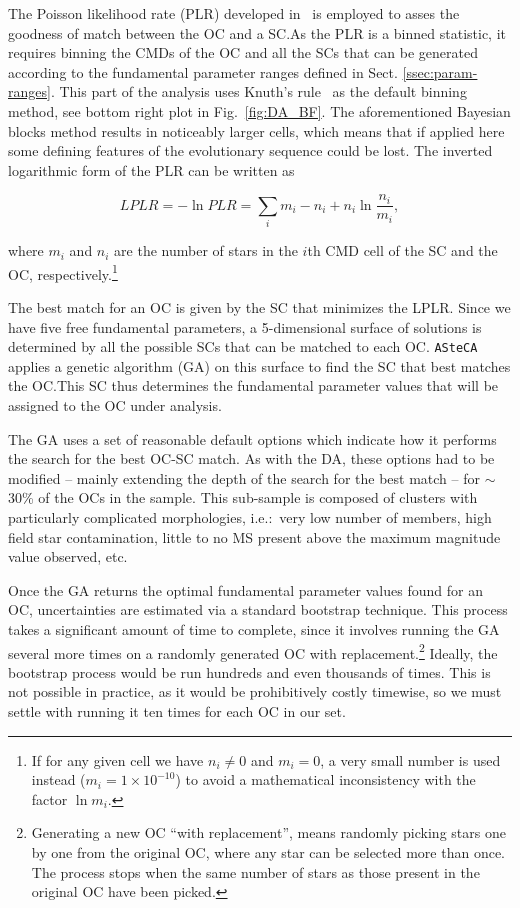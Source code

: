 \documentclass[a4paper,fleqn,usenatbib]{mnras}
\begin{document}
The Poisson likelihood rate (PLR) developed in~\cite{Dolphin_2002} is employed
to asses the goodness of match between the OC and a SC.\@ As the PLR is a
binned statistic, it requires binning the CMDs of the OC and all the SCs that
can be generated according to the fundamental parameter ranges defined in Sect.
\ref{ssec:param-ranges}. This part of the analysis uses Knuth's
rule~\citep[][also implemented via the astroML package]{Knuth_2006} as the
default binning method, see bottom right plot in Fig.~\ref{fig:DA_BF}.
The aforementioned Bayesian blocks method results in noticeably larger cells,
which means that if applied here some defining features of the evolutionary
sequence could be lost.
%
The inverted logarithmic form of the PLR can be written as

\begin{equation}
LPLR  = -\ln PLR = \sum_i m_i - n_i + n_i \ln \frac{n_i}{m_i},
\label{eq:likelihood}
\end{equation}

\noindent where $m_i$ and $n_i$ are the number of stars in the $i$th CMD cell of
the SC and the OC, respectively.\footnote{If for any given cell we have
$n_i\neq0$ and $m_i=0$, a very small number is used instead ($m_i=1{\times}10^
{-10}$) to avoid a mathematical inconsistency with the factor $\ln m_i$.}

The best match for an OC is given by the SC that minimizes the LPLR.\@
Since we have five free fundamental parameters, a 5-dimensional surface of
solutions is determined by all the possible SCs that can be matched to each
OC.\@
%
\texttt{ASteCA} applies a genetic algorithm (GA) on this surface to find the SC
that best matches the OC.\@ This SC thus determines the fundamental parameter
values that will be assigned to the OC under analysis.\@

The GA uses a set of reasonable default options which indicate how it performs
the search for the best OC-SC match.
As with the DA, these options had to be modified -- mainly extending the depth
of the search for the best match -- for $\sim$30\% of the OCs in the
sample. This sub-sample is composed of clusters
with particularly complicated morphologies, i.e.:\ very low number of members,
high field star contamination, little to no MS present above the
maximum magnitude value observed, etc. 

Once the GA returns the optimal fundamental parameter values found for an OC,
uncertainties are estimated via a standard bootstrap technique. This process
takes a significant amount of time to complete, since it involves running the GA
several more times on a randomly generated OC with replacement.\footnote
{Generating a new OC ``with replacement'', means randomly picking stars one by
one from the original OC, where any star can be selected more than once. The
process stops when the same number of stars as those present in the original OC
have been picked.} Ideally, the bootstrap process would be run hundreds and even
thousands of times. This is not possible in practice, as it would be
prohibitively costly timewise, so we must settle with running it ten times for
each OC in our set.
\end{document}

